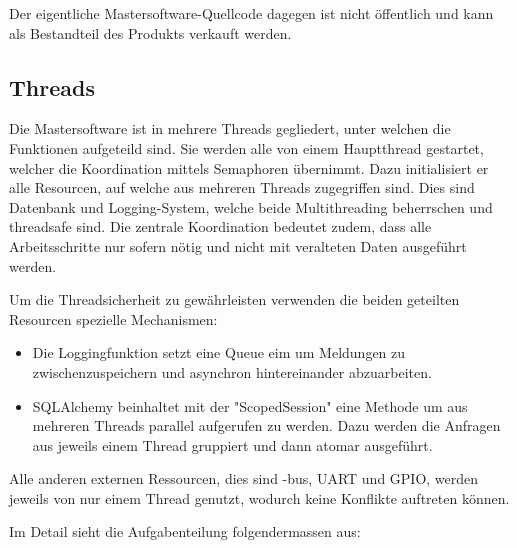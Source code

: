 Der eigentliche  Mastersoftware-Quellcode dagegen  ist nicht  \"offentlich und
kann als Bestandteil des Produkts verkauft werden.



\subsection{Threads}
\label{subsec:software:master:threads}


Die  Mastersoftware  ist in  mehrere  Threads  gegliedert, unter  welchen  die
Funktionen aufgeteild  sind. Sie werden alle von  einem Hauptthread gestartet,
welcher die Koordination mittels Semaphoren \"ubernimmt. Dazu initialisiert er
alle  Resourcen,  auf  welche  aus  mehreren  Threads  zugegriffen  sind. Dies
sind  Datenbank und  Logging-System, welche  beide Multithreading  beherrschen
und  threadsafe  sind. Die zentrale  Koordination  bedeutet  zudem, dass  alle
Arbeitsschritte nur sofern n\"otig und nicht mit veralteten Daten ausgef\"uhrt
werden.

Um  die Threadsicherheit  zu  gew\"ahrleisten verwenden  die beiden  geteilten
Resourcen spezielle Mechanismen:
\begin{itemize}
    \tightlist
    \item
        Die   Loggingfunktion   setzt  eine   Queue   eim   um  Meldungen   zu
        zwischenzuspeichern und asynchron hintereinander abzuarbeiten.
     \item
        SQLAlchemy  beinhaltet   mit  der  "ScopedSession"  eine   Methode  um
        aus  mehreren  Threads  parallel  aufgerufen  zu  werden. Dazu  werden
        die  Anfragen  aus jeweils  einem  Thread  gruppiert und  dann  atomar
        ausgef\"uhrt.
 \end{itemize}

Alle anderen  externen Ressourcen, dies  sind \ISC-bus, UART und  GPIO, werden
jeweils  von  nur einem  Thread  genutzt,  wodurch keine  Konflikte  auftreten
k\"onnen.

Im Detail sieht die Aufgabenteilung folgendermassen aus:


